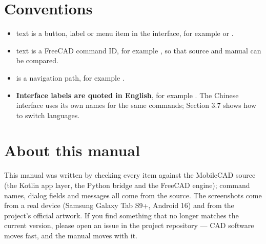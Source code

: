 \section*{Conventions}
\begin{itemize}
  \item {} text is a button, label or menu item in the interface, for example  or
        .
  \item {} text is a FreeCAD command ID, for example , so that source and
        manual can be compared.
  \item {} is a navigation path, for example .
  \item \textbf{Interface labels are quoted in English}, for example . The Chinese interface uses
        its own names for the same commands; Section 3.7 shows how to switch languages.
\end{itemize}

\section*{About this manual}
This manual was written by checking every item against the MobileCAD source (the Kotlin app layer, the Python
bridge and the FreeCAD engine); command names, dialog fields and messages all come from the source. The
screenshots come from a real device (Samsung Galaxy Tab S9+, Android 16) and from the project's official
artwork. If you find something that no longer matches the current version, please open an issue in the project
repository — CAD software moves fast, and the manual moves with it.
